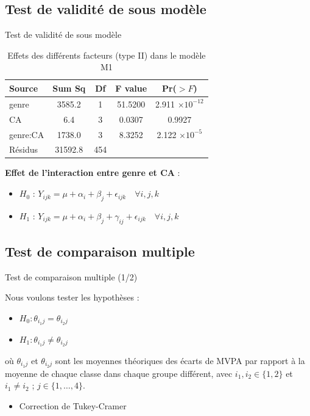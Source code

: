 \documentclass{beamer}
\begin{document}
	\subsection{Test de validité de sous modèle}
	\begin{frame}{Test de validité de sous modèle}
		\begin{table}[H]
			\centering
			\caption{Effets des différents facteurs (type II) dans le modèle M1}
			\begin{tabular}{lcccc}
				\toprule
				Source & Sum Sq & Df & F value & Pr($>F$) \\ 
				\midrule
				genre & 3585.2 & 1 & 51.5200 & 2.911 $\times 10^{-12}$ \\ 
				CA & 6.4 & 3 & 0.0307 & 0.9927 \\ 
				genre:CA & 1738.0 & 3 & 8.3252 & 2.122 $\times 10^{-5}$ \\ 
				Résidus & 31592.8 & 454 & & \\ 
				\bottomrule
			\end{tabular}
			\label{tab:anova_results2}
		\end{table}
		
		\textbf{Effet de l'interaction entre genre et CA} :
		\begin{itemize}
			\item \textbf{$H_0$} : $Y_{ijk} = \mu + \alpha_i + \beta_j + \epsilon_{ijk} \quad \forall i,j,k$ 
			\item \textbf{$H_1$} : $Y_{ijk} = \mu + \alpha_i + \beta_j + \gamma_{ij} + \epsilon_{ijk} \quad \forall i,j,k$
		\end{itemize}
	\end{frame}
	
	\subsection{Test de comparaison multiple}
	\begin{frame}{Test de comparaison multiple (1/2)}
		
		Nous voulons tester les hypothèses :
		\begin{itemize}
			\item $H_0 : \theta_{i_1j} = \theta_{i_2j}$
			\item $H_1 : \theta_{i_1j} \neq \theta_{i_2j}$
		\end{itemize}
		où $\theta_{i_1j}$ et $\theta_{i_2j}$ sont les moyennes théoriques des écarts de MVPA par rapport à la moyenne de chaque classe dans chaque groupe différent, avec $i_1, i_2 \in \{1, 2\}$ et $i_1 \neq i_2$ ; $j \in \{1, \ldots, 4\}$. \\
		\pause
		\begin{itemize}
			\vfill
			\item Correction de Tukey-Cramer
		\end{itemize}
	\end{frame}
	
\end{document}
